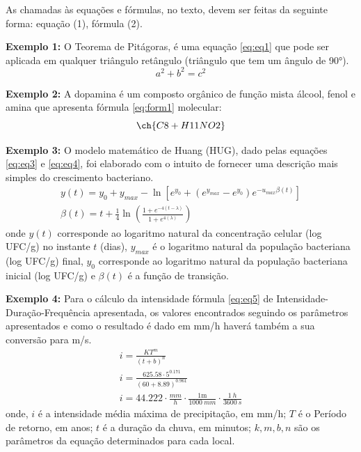 As chamadas às equações e fórmulas, no texto, devem ser feitas da seguinte forma: equação (1), fórmula (2).

\textbf{Exemplo 1:}
O Teorema de Pitágoras, é uma equação \eqref{eq:eq1} que pode ser aplicada em qualquer triângulo retângulo (triângulo que tem um ângulo de 90°).
\begin{equation} \label{eq:eq1}
a^2 + b^2 = c^2 
\end{equation}

\textbf{Exemplo 2:}
A dopamina é um composto orgânico de função mista álcool, fenol e amina que apresenta fórmula \eqref{eq:form1} molecular:
\begin{equation} \label{eq:form1}
\ch{C8 + H11NO2} 
\end{equation}

\textbf{Exemplo 3:}
O modelo matemático de Huang (HUG), dado pelas equações \eqref{eq:eq3} e \eqref{eq:eq4}, foi elaborado com o intuito de fornecer uma descrição mais simples do crescimento bacteriano.
\begin{gather} 
	y(t) = y_0 + y_{max} -\ln{[e^{y_0}  + (e^{y_{max}} -e^{y_0} )  e^{-u_{max}\beta(t)} ]}   \label{eq:eq3}  \\
	\beta(t) = t + \frac{1}{4}\ln\left( \frac{1+ e^{-4(t-\lambda)} }{1+ e^{4(\lambda)} }\right) \label{eq:eq4}
\end{gather}
\noindent onde $y(t)$ corresponde ao logaritmo natural da concentração celular (log UFC/g) no instante $t$ (dias), $y_{max}$ é o logaritmo natural da população bacteriana (log UFC/g) final, $y_0$ corresponde ao logaritmo natural da população bacteriana inicial (log UFC/g) e $\beta(t)$ é a função de transição.

\textbf{Exemplo 4:}
Para o cálculo da intensidade fórmula \eqref{eq:eq5} de Intensidade-Duração-Frequência apresentada, os valores encontrados seguindo os parâmetros apresentados e como o resultado é dado em mm/h haverá também a sua conversão para m/s.
\begin{gather} 
	i = \frac{K T^m}{(t+b)^n}   \label{eq:eq5}  \\[2ex]
		i = \frac{\num{625.58} \cdot 5^{\num{0.171}}  }{(60+\num{8.89})^{\num{0.961}}} \\[2ex]
		i = \num{44.222} \cdot \frac{\si{mm}}{\si{h}} \cdot \frac{1\mathrm{m}}{\SI{1000}{mm}} \cdot \frac{\SI{1}{h}}{\SI{3600}{s}} 	
\end{gather}
\noindent onde, $i$ é a intensidade média máxima de precipitação, em mm/h; $T$ é o Período de retorno, em anos; $t$ é a duração da chuva, em minutos; $k,m,b,n$ são os parâmetros da equação determinados para cada local.


